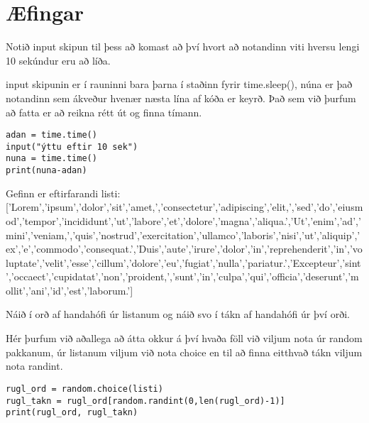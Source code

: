 \newpage
\section{Æfingar}

\begin{exercise}\label{imp1}
Notið input skipun til þess að komast að því hvort að notandinn viti hversu lengi 10 sekúndur eru að líða. 
\end{exercise}
\begin{Answer}[ref={imp1}]
input skipunin er í rauninni bara þarna í staðinn fyrir time.sleep(), núna er það notandinn sem ákveður hvenær næsta lína af kóða er keyrð.
Það sem við þurfum að fatta er að reikna rétt út og finna tímann.
	\begin{lstlisting}
adan = time.time()
input("ýttu eftir 10 sek")
nuna = time.time()
print(nuna-adan)\end{lstlisting}
\end{Answer}


\begin{exercise}\label{imp2}
Gefinn er eftirfarandi listi: 
['Lorem','ipsum','dolor','sit','amet,','consectetur','adipiscing','elit,','sed','do','eiusmod','tempor','incididunt','ut','labore','et','dolore','magna','aliqua.','Ut','enim','ad','mini','veniam,','quis','nostrud','exercitation','ullamco','laboris','nisi','ut','aliquip','ex','e','commodo','consequat.','Duis','aute','irure','dolor','in','reprehenderit','in','voluptate','velit','esse','cillum','dolore','eu','fugiat','nulla','pariatur.','Excepteur','sint','occaect','cupidatat','non','proident,','sunt','in','culpa','qui','officia','deserunt','mollit','ani','id','est','laborum.']

Náið í orð af handahófi úr listanum og náið svo í tákn af handahófi úr því orði.
\end{exercise}
\begin{Answer}[ref={imp2}]
Hér þurfum við aðallega að átta okkur á því hvaða föll við viljum nota úr random pakkanum, úr listanum viljum við nota choice en til að finna eitthvað tákn viljum nota randint.
	\begin{lstlisting}
rugl_ord = random.choice(listi)
rugl_takn = rugl_ord[random.randint(0,len(rugl_ord)-1)]
print(rugl_ord, rugl_takn)\end{lstlisting}
\end{Answer}